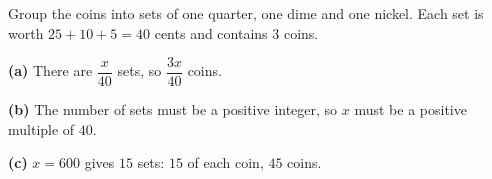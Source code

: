 Group the coins into sets of one quarter, one dime and one nickel. Each set is worth $25+10+5=40$ cents and contains $3$ coins.

\textbf{(a)} There are $\dfrac {x}{40}$ sets, so $\boxed{\dfrac{3x}{40}}$ coins.

\textbf{(b)} The number of sets must be a positive integer, so $x$ must be a positive multiple of $40$.

\textbf{(c)} $x=600$ gives $15$ sets: $15$ of each coin, $\boxed{45}$ coins.
